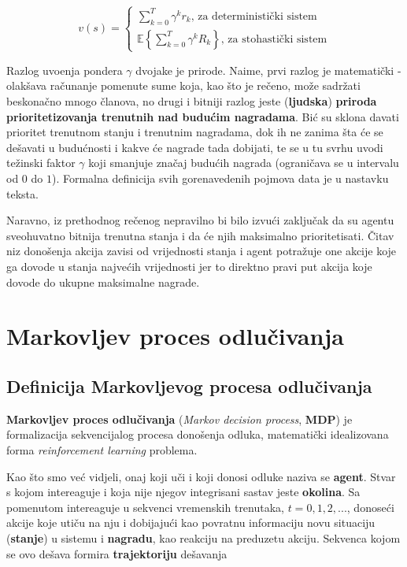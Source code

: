 \documentclass[12pt]{IEEEtran}
\numberwithin{equation}{subsection}
\numberwithin{figure}{subsection}
\theoremstyle{definition}
\numberwithin{example}{section}
\begin{document}
\begin{equation}
    v(s) = \begin{cases}
        \sum_{k = 0}^{T}{\gamma^{k}r_k} \text{, za deterministi\v{c}ki sistem} \\
        \mathbb{E}\left\{\sum_{k = 0}^{T}{\gamma^{k}R_k}\right\} \text{, za stohasti\v{c}ki sistem}
    \end{cases}
\end{equation}

Razlog uvo\dj{}enja pondera $\gamma$ dvojake je prirode. Naime,
prvi razlog je matemati\v{c}ki - olak\v{s}ava ra\v{c}unanje
pomenute sume koja, kao \v{s}to je re\v{c}eno,
mo\v{z}e sadr\v{z}ati beskona\v{c}no mnogo \v{c}lanova, no drugi i bitniji razlog
jeste (\textbf{ljudska}) \textbf{priroda prioritetizovanja trenutnih
nad budu\'{c}im nagradama}. Bi\'{c} su sklona davati
prioritet trenutnom stanju i trenutnim nagradama, dok ih ne
zanima \v{s}ta \'{c}e se de\v{s}avati u budu\'{c}nosti i kakve
\'{c}e nagrade tada dobijati, te se u tu svrhu
uvodi te\v{z}inski faktor $\gamma$ koji smanjuje zna\v{c}aj budu\'{c}ih
nagrada (ograni\v{c}ava se u intervalu od $0$ do $1$).
Formalna definicija svih gorenavedenih pojmova data je u nastavku teksta.

Naravno, iz prethodnog re\v{c}enog nepravilno bi bilo izvu\'{c}i
zaklju\v{c}ak da su agentu sveohuvatno bitnija
trenutna stanja i da \'{c}e njih maksimalno prioritetisati.
\v{C}itav niz dono\v{s}enja akcija zavisi od vrijednosti stanja i
agent potra\v{z}uje one akcije koje ga dovode u stanja najve\'{c}ih
vrijednosti jer to direktno pravi put akcija koje dovode do
ukupne maksimalne nagrade.

\newpage
\section{\textbf{Markovljev proces odlu\v{c}ivanja}}

\subsection{\textbf{Definicija Markovljevog procesa odlu\v{c}ivanja}}

\textbf{Markovljev proces odlučivanja} (\textit{Markov decision process}, \textbf{MDP}) je
formalizacija sekvencijalog procesa dono\v{s}enja odluka, matemati\v{c}ki
idealizovana forma \textit{reinforcement learning} problema.

Kao \v{s}to smo ve\'{c} vidjeli, onaj koji u\v{c}i i koji donosi odluke
naziva se \textbf{agent}. Stvar s kojom intereaguje i koja nije njegov
integrisani sastav jeste \textbf{okolina}. Sa pomenutom intereaguje
u sekvenci vremenskih trenutaka, $t = 0, 1, 2, ...$, donose\'{c}i akcije
koje uti\v{c}u na nju i dobijaju\'{c}i kao povratnu informaciju
novu situaciju (\textbf{stanje}) u sistemu i \textbf{nagradu},
kao reakciju na preduzetu akciju. Sekvenca kojom se ovo de\v{s}ava
formira \textbf{trajektoriju} de\v{s}avanja
\end{document}
